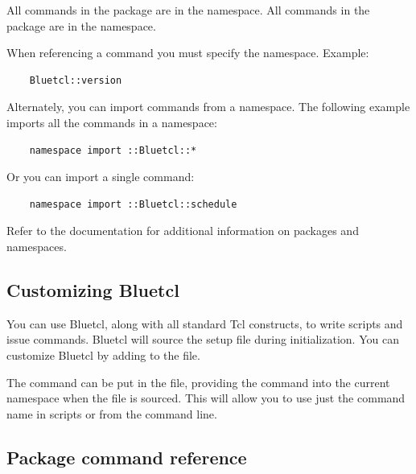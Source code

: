 All commands in the  package are in the 
namespace.  All commands in the  package are in the
 namespace.

When referencing a command you must specify the namespace.  Example:
\begin{verbatim}
    Bluetcl::version
\end{verbatim}
Alternately, you can import commands from a namespace.  The following example
imports all the commands in a namespace:
\begin{verbatim}
    namespace import ::Bluetcl::*
\end{verbatim}
Or you can import a single command:
\begin{verbatim}
    namespace import ::Bluetcl::schedule
\end{verbatim}

Refer to the  documentation for additional information on packages
and namespaces.


\subsection{Customizing Bluetcl}
\label{custom}

You can use Bluetcl, along with all standard Tcl constructs, to
write scripts and issue commands.
Bluetcl will source the setup
file  during initialization.  You can customize
Bluetcl by adding to the  file.


The  command can be put in the 
file, providing the command into the current namespace when the file
is sourced.  This will allow you to use just the command name in
scripts or from the command line.


\subsection{Package command reference}

